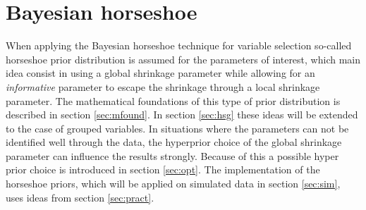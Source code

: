 \documentclass[12pt,letterpaper]{article}
\numberwithin{equation}{subsection}
\begin{document}
\section{Bayesian horseshoe}
\label{sec:hs}
When applying the Bayesian horseshoe technique for variable selection so-called horseshoe prior distribution is assumed for the parameters of interest, which main idea consist in using a global shrinkage parameter while allowing for an \textit{informative} parameter to escape the shrinkage through a local shrinkage parameter. The mathematical foundations of this type of prior distribution is described in section \ref{sec:mfound}. In section \ref{sec:hsg} these ideas will be extended to the case of grouped variables. In situations where the parameters can not be identified well through the data, the hyperprior choice of the global shrinkage parameter can influence the results strongly. Because of this a possible hyper prior choice is introduced in section \ref{sec:opt}. The implementation of the horseshoe priors, which will be applied on simulated data in section \ref{sec:sim}, uses ideas from section \ref{sec:pract}.
\end{document}
